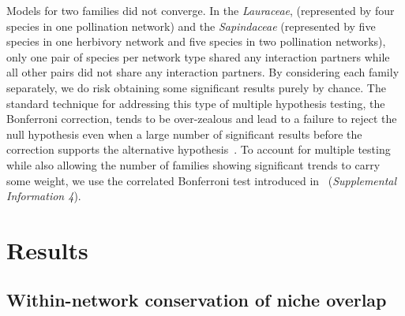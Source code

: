 \documentclass[12pt]{article}
\begin{document}
\begin{spacing}{1.5}
    Models for two families did not converge. In the \emph{Lauraceae}, (represented by four species in one pollination network) and the \emph{Sapindaceae} (represented by five species in one herbivory network and five species in two pollination networks), only one pair of species per network type shared any interaction partners while all other pairs did not share any interaction partners. By considering each family separately, we do risk obtaining some significant results purely by chance. The standard technique for addressing this type of multiple hypothesis testing, the Bonferroni correction, tends to be over-zealous and lead to a failure to reject the null hypothesis even when a large number of significant results before the correction supports the alternative hypothesis~\citep{Moran2003}. To account for multiple testing while also allowing the number of families showing significant trends to carry some weight, we use the correlated Bonferroni test introduced in~\citet{Drezler2016} (\emph{Supplemental Information 4}).



\section*{Results}


  \subsection*{Within-network conservation of niche overlap} 


\end{spacing}
\end{document}

